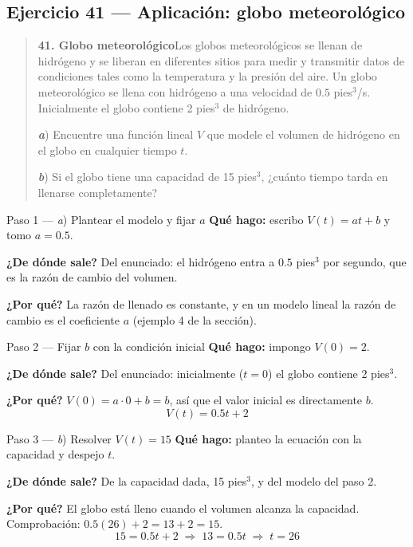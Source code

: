 \documentclass[11pt]{article}
\begin{document}
\subsection*{Ejercicio 41 — Aplicación: globo meteorológico}

\begin{quote}
\textbf{41. Globo meteorológico}\quad Los globos meteorológicos se llenan de hidrógeno y se liberan en diferentes sitios para medir y transmitir datos de condiciones tales como la temperatura y la presión del aire. Un globo meteorológico se llena con hidrógeno a una velocidad de $0.5$ pies$^3$/s. Inicialmente el globo contiene 2 pies$^3$ de hidrógeno.

\textbf{\textit{a}}) Encuentre una función lineal $V$ que modele el volumen de hidrógeno en el globo en cualquier tiempo $t$.

\textbf{\textit{b}}) Si el globo tiene una capacidad de 15 pies$^3$, ¿cuánto tiempo tarda en llenarse completamente?
\end{quote}

\begin{paso}{Paso 1 --- \textit{a}) Plantear el modelo y fijar $a$}
\textbf{Qué hago:} escribo $V(t)=at+b$ y tomo $a=0.5$.

\textbf{¿De dónde sale?} Del enunciado: el hidrógeno entra a $0.5$ pies$^3$ por segundo, que es la razón de cambio del volumen.

\textbf{¿Por qué?} La razón de llenado es constante, y en un modelo lineal la razón de cambio es el coeficiente $a$ (ejemplo 4 de la sección).
\end{paso}

\begin{paso}{Paso 2 --- Fijar $b$ con la condición inicial}
\textbf{Qué hago:} impongo $V(0)=2$.

\textbf{¿De dónde sale?} Del enunciado: inicialmente ($t=0$) el globo contiene 2 pies$^3$.

\textbf{¿Por qué?} $V(0)=a\cdot 0+b=b$, así que el valor inicial es directamente $b$.
\[
V(t)=0.5t+2
\]
\end{paso}

\begin{paso}{Paso 3 --- \textit{b}) Resolver $V(t)=15$}
\textbf{Qué hago:} planteo la ecuación con la capacidad y despejo $t$.

\textbf{¿De dónde sale?} De la capacidad dada, 15 pies$^3$, y del modelo del paso 2.

\textbf{¿Por qué?} El globo está lleno cuando el volumen alcanza la capacidad. Comprobación: $0.5(26)+2=13+2=15$.
\[
15=0.5t+2 \;\Longrightarrow\; 13=0.5t \;\Longrightarrow\; t=26
\]
\end{paso}
\end{document}
